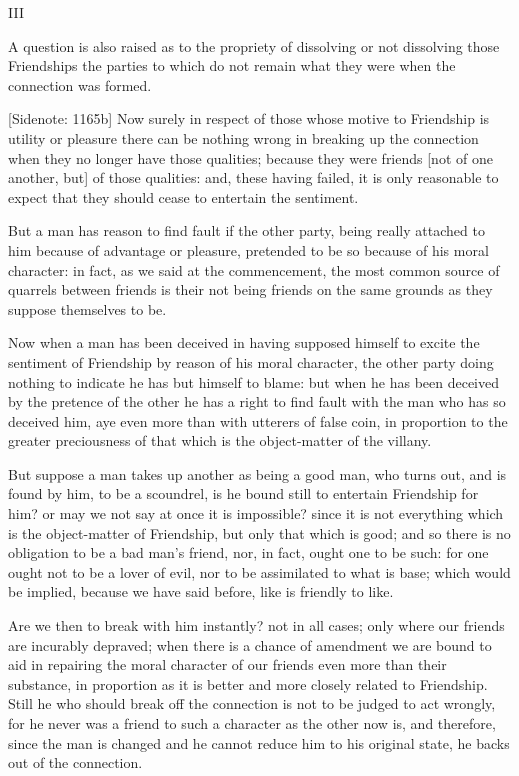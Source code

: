 III

A question is also raised as to the propriety of dissolving or not
dissolving those Friendships the parties to which do not remain what
they were when the connection was formed.

[Sidenote: 1165b] Now surely in respect of those whose motive to
Friendship is utility or pleasure there can be nothing wrong in breaking
up the connection when they no longer have those qualities; because they
were friends [not of one another, but] of those qualities: and, these
having failed, it is only reasonable to expect that they should cease to
entertain the sentiment.

But a man has reason to find fault if the other party, being really
attached to him because of advantage or pleasure, pretended to be so
because of his moral character: in fact, as we said at the commencement,
the most common source of quarrels between friends is their not being
friends on the same grounds as they suppose themselves to be.

Now when a man has been deceived in having supposed himself to excite
the sentiment of Friendship by reason of his moral character, the other
party doing nothing to indicate he has but himself to blame: but when he
has been deceived by the pretence of the other he has a right to find
fault with the man who has so deceived him, aye even more than with
utterers of false coin, in proportion to the greater preciousness of
that which is the object-matter of the villany.

But suppose a man takes up another as being a good man, who turns out,
and is found by him, to be a scoundrel, is he bound still to entertain
Friendship for him? or may we not say at once it is impossible? since
it is not everything which is the object-matter of Friendship, but only
that which is good; and so there is no obligation to be a bad man's
friend, nor, in fact, ought one to be such: for one ought not to be a
lover of evil, nor to be assimilated to what is base; which would be
implied, because we have said before, like is friendly to like.

Are we then to break with him instantly? not in all cases; only where
our friends are incurably depraved; when there is a chance of amendment
we are bound to aid in repairing the moral character of our friends
even more than their substance, in proportion as it is better and
more closely related to Friendship. Still he who should break off the
connection is not to be judged to act wrongly, for he never was a friend
to such a character as the other now is, and therefore, since the man is
changed and he cannot reduce him to his original state, he backs out of
the connection.

